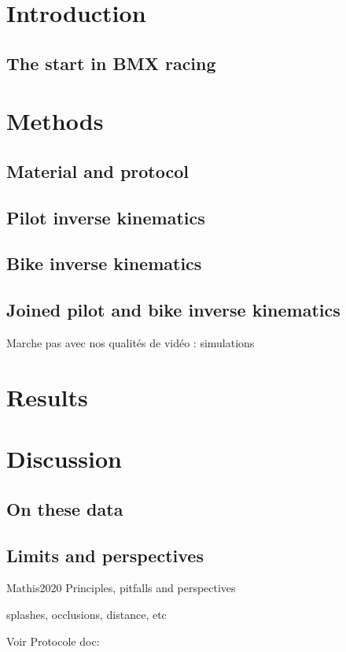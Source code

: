 \minitoc
\newpage


\section{Introduction}
\subsection{The start in BMX racing}
\blindtext


\section{Methods}
\subsection{Material and protocol}
\blindtext

\subsection{Pilot inverse kinematics}
\blindtext

\subsection{Bike inverse kinematics}
\blindtext

\subsection{Joined pilot and bike inverse kinematics}
Marche pas avec nos qualités de vidéo : simulations

\blindtext


\section{Results}
\blindtext


\section{Discussion}
\subsection{On these data}
\blindtext

\subsection{Limits and perspectives}


Mathis2020 Principles, pitfalls and perspectives

splashes, occlusions, distance, etc

Voir Protocole doc: %
